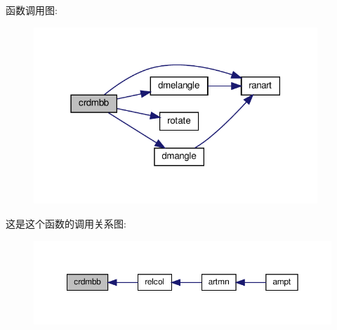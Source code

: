 函数调用图\+:
\nopagebreak
\begin{figure}[H]
\begin{center}
\leavevmode
\includegraphics[width=303pt]{crdmbb_8f90_a919fdb85fb54df3694e88ddff1605bcf_cgraph}
\end{center}
\end{figure}
这是这个函数的调用关系图\+:
\nopagebreak
\begin{figure}[H]
\begin{center}
\leavevmode
\includegraphics[width=350pt]{crdmbb_8f90_a919fdb85fb54df3694e88ddff1605bcf_icgraph}
\end{center}
\end{figure}
